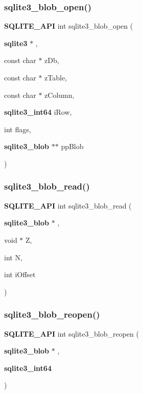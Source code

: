\subsubsection{sqlite3\_blob\_open()}
{\footnotesize\ttfamily \textbf{ S\+Q\+L\+I\+T\+E\+\_\+\+A\+PI} int sqlite3\+\_\+blob\+\_\+open (\begin{DoxyParamCaption}\item[{\textbf{ sqlite3} $\ast$}]{,  }\item[{const char $\ast$}]{z\+Db,  }\item[{const char $\ast$}]{z\+Table,  }\item[{const char $\ast$}]{z\+Column,  }\item[{\textbf{ sqlite3\+\_\+int64}}]{i\+Row,  }\item[{int}]{flags,  }\item[{\textbf{ sqlite3\+\_\+blob} $\ast$$\ast$}]{pp\+Blob }\end{DoxyParamCaption})}

\mbox{\label{sqlite3_8h_ae63f397da378931a64a597069ce3532a}} 
\subsubsection{sqlite3\_blob\_read()}
{\footnotesize\ttfamily \textbf{ S\+Q\+L\+I\+T\+E\+\_\+\+A\+PI} int sqlite3\+\_\+blob\+\_\+read (\begin{DoxyParamCaption}\item[{\textbf{ sqlite3\+\_\+blob} $\ast$}]{,  }\item[{void $\ast$}]{Z,  }\item[{int}]{N,  }\item[{int}]{i\+Offset }\end{DoxyParamCaption})}

\mbox{\label{sqlite3_8h_a0e309bef9d8ebc22e84e88d61c602136}} 
\subsubsection{sqlite3\_blob\_reopen()}
{\footnotesize\ttfamily \textbf{ S\+Q\+L\+I\+T\+E\+\_\+\+A\+PI} int sqlite3\+\_\+blob\+\_\+reopen (\begin{DoxyParamCaption}\item[{\textbf{ sqlite3\+\_\+blob} $\ast$}]{,  }\item[{\textbf{ sqlite3\+\_\+int64}}]{ }\end{DoxyParamCaption})}


